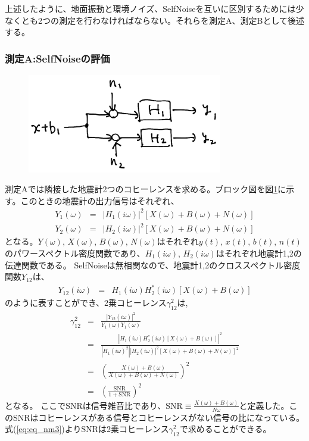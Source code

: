 上述したように、地面振動と環境ノイズ、SelfNoiseを互いに区別するためには少なくとも2つの測定を行わなければならない。それらを測定A、測定Bとして後述する。


\subsubsection{測定A:SelfNoiseの評価}
\begin{figure}[H]
  \begin{center}
    \includegraphics[width=8.5cm]{./img_noisemeasurement_testa.png}
  \end{center}
  \caption{
  }\label{img:img_testA}
\end{figure}

測定Aでは隣接した地震計2つのコヒーレンスを求める。ブロック図を図\ref{img:img_testA}に示す。このときの地震計の出力信号はそれぞれ、
\begin{eqnarray}
  Y_{1}(\omega) &=& \left| H_{1}(i\omega)\right|^{2}\left[X(\omega)+B(\omega)+N(\omega) \right] \label{eq:eq_nm1} \\ 
  Y_{2}(\omega) &=& \left| H_{2}(i\omega)\right|^{2}\left[X(\omega)+B(\omega)+N(\omega) \right] \label{eq:eq_nm2}
\end{eqnarray}
となる。$Y(\omega),\,X(\omega),\,B(\omega),\,N(\omega)$はそれぞれ$y(t),\,x(t),\,b(t),\,n(t)$のパワースペクトル密度関数であり、$H_1(i\omega),\,H_2(i\omega)$はそれぞれ地震計1,2の伝達関数である。
SelfNoiseは無相関なので、地震計1,2のクロススペクトル密度関数$Y_{12}$は、
\begin{eqnarray}
Y_{12}(i\omega) &=& H_{1}(i\omega)H_{2}^{*}(i\omega)\left[X(\omega)+B(\omega) \right] 
\end{eqnarray}
のように表すことができ、2乗コヒーレンス$\gamma_{12}^{2}$は,
\begin{eqnarray}
  \gamma_{12}^{2} &=& \frac{\left| Y_{12}(i\omega)\right|^{2}}{Y_1(\omega)Y_1({\omega})}\\
  &=& \frac{\left | H_{1}(i\omega)H_{2}^{*}(i\omega)\left[X(\omega)+B(\omega) \right] \right |^{2}}{\left| H_{1}(i\omega)^{2}\right|\left|H_{2}(i\omega)\right|^{2}\left[X(\omega)+B(\omega)+N(\omega) \right]^{2}}\\
  &=& \left( \frac{X(\omega)+B(\omega)}{X(\omega)+B(\omega)+N(\omega)} \right)^{2}\\
    &=& \left( \frac{\mathrm{SNR}}{1+\mathrm{SNR}} \right)^{2}\label{eq:eq_nm3}
\end{eqnarray}
となる。
ここで$\mathrm{SNR}$は信号雑音比であり、$\mathrm{SNR}\equiv \frac{X(\omega)+B(\omega)}{N{\omega}}$と定義した。このSNRはコヒーレンスがある信号とコヒーレンスがない信号の比になっている。式(\ref{eq:eq_nm3})より$\mathrm{SNR}$は2乗コヒーレンス$\gamma^{2}_{12}$で求めることができる。

